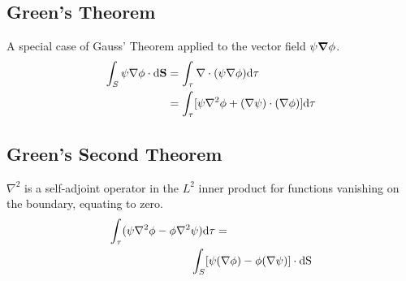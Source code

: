 \subsection*{Green's Theorem}
A special case of Gauss' Theorem applied to the vector field $\psi \grad \phi$.
\begin{equation*}
    \begin{aligned}
        \int_{S} \psi \nabla \phi \cdot \differential \mathbf{S} &= \int_{\tau} \nabla \cdot (\psi \nabla \phi) \differential \tau \\
        &= \int_{\tau} [\psi \nabla^2 \phi + (\nabla \psi) \cdot (\nabla \phi)] \differential \tau
    \end{aligned}
\end{equation*}
\subsection*{Green's Second Theorem}
$\nabla^2$ is a self-adjoint operator in the $L^2$ inner product for functions vanishing on the boundary, equating to zero.
\begin{equation*}
    \begin{aligned}
    \int_{\tau}(\psi \nabla^2 \phi - \phi \nabla^2 &\psi) \differential \tau = \\
    &\int_{S} [\psi(\nabla \phi) - \phi(\nabla \psi)] \cdot \differential \mathrm{S}
    \end{aligned}
\end{equation*}
